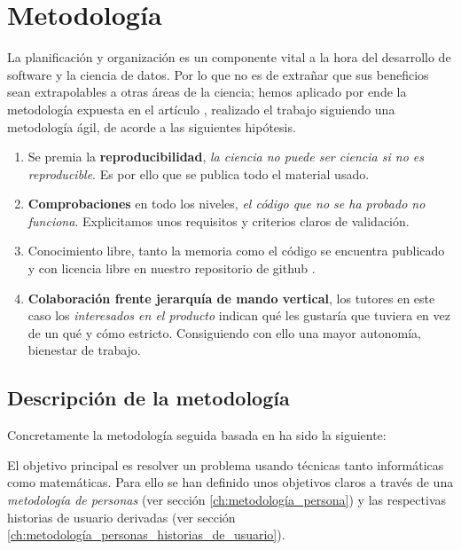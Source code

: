 %

\chapter{Metodología}

La planificación y organización es un componente vital a la hora del desarrollo de software 
y la ciencia de datos. Por lo que no es de extrañar que sus beneficios sean extrapolables
a otras áreas de la ciencia; 
hemos aplicado por ende la 
metodología expuesta en el artículo \cite{DBLP:journals/corr/abs-2104-12545}, realizado 
el trabajo siguiendo una metodología ágil, de acorde a las siguientes hipótesis. 

\begin{enumerate}
    \item Se premia la \textbf{reproducibilidad}, \textit{la ciencia no puede ser ciencia si no es reproducible}. Es por 
    ello que se publica todo el material usado. 
    \item \textbf{Comprobaciones} en todo los niveles, \textit{el código que no se ha probado no funciona}. 
    Explicitamos unos requisitos y criterios claros de validación. 
    \item Conocimiento libre, tanto la memoria como el código se encuentra publicado y con licencia libre en nuestro repositorio 
    de github \cite{TFG-Estudio-de-las-redes-neuronales}.
    \item \textbf{Colaboración frente jerarquía de mando vertical}, los tutores en este caso 
    los \textit{interesados en el producto} 
    indican qué les gustaría que tuviera en vez de un qué y cómo estricto. Consiguiendo con ello una mayor autonomía, bienestar de trabajo.
     
\end{enumerate}  

\section{Descripción de la metodología }  

Concretamente la metodología seguida basada en \cite{que-es-un-trabajo-fin-de-x} ha sido la siguiente: 

El objetivo principal es resolver un problema usando técnicas tanto informáticas como matemáticas. Para ello 
se han definido unos objetivos claros a través de una \textit{metodología de personas} 
(ver sección \ref{ch:metodología_persona}) \cite{personas-why-and-how-you-should-use-them}
y las respectivas historias de usuario derivadas (ver sección \ref{ch:metodología_personas_historias_de_usuario}).   

